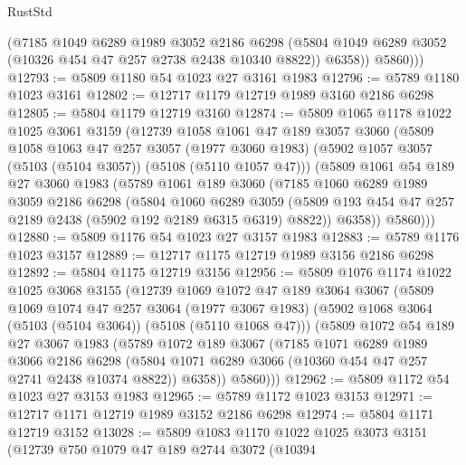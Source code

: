 \begin{lexlean}{RustStd}
\begin{coremodule}
            (@7185
              @1049
              @6289
              @1989
              @3052
              @2186
              @6298
              (@5804 @1049 @6289 @3052 (@10326 @454 @47 @257 @2738 @2438 @10340 @8822))
              @6358))
          @5860)))
@12793 := @5809 @1180 @54 @1023 @27 @3161 @1983
@12796 := @5789 @1180 @1023 @3161
@12802 := @12717 @1179 @12719 @1989 @3160 @2186 @6298
@12805 := @5804 @1179 @12719 @3160
@12874 := @5809
    @1065
    @1178
    @1022
    @1025
    @3061
    @3159
    (@12739
      @1058
      @1061
      @47
      @189
      @3057
      @3060
      (@5809
        @1058
        @1063
        @47
        @257
        @3057
        (@1977 @3060 @1983)
        (@5902 @1057 @3057 (@5103 (@5104 @3057)) (@5108 (@5110 @1057 @47)))
        (@5809
          @1061
          @54
          @189
          @27
          @3060
          @1983
          (@5789
            @1061
            @189
            @3060
            (@7185
              @1060
              @6289
              @1989
              @3059
              @2186
              @6298
              (@5804
                @1060
                @6289
                @3059
                (@5809 @193 @454 @47 @257 @2189 @2438 (@5902 @192 @2189 @6315 @6319) @8822))
              @6358))
          @5860)))
@12880 := @5809 @1176 @54 @1023 @27 @3157 @1983
@12883 := @5789 @1176 @1023 @3157
@12889 := @12717 @1175 @12719 @1989 @3156 @2186 @6298
@12892 := @5804 @1175 @12719 @3156
@12956 := @5809
    @1076
    @1174
    @1022
    @1025
    @3068
    @3155
    (@12739
      @1069
      @1072
      @47
      @189
      @3064
      @3067
      (@5809
        @1069
        @1074
        @47
        @257
        @3064
        (@1977 @3067 @1983)
        (@5902 @1068 @3064 (@5103 (@5104 @3064)) (@5108 (@5110 @1068 @47)))
        (@5809
          @1072
          @54
          @189
          @27
          @3067
          @1983
          (@5789
            @1072
            @189
            @3067
            (@7185
              @1071
              @6289
              @1989
              @3066
              @2186
              @6298
              (@5804 @1071 @6289 @3066 (@10360 @454 @47 @257 @2741 @2438 @10374 @8822))
              @6358))
          @5860)))
@12962 := @5809 @1172 @54 @1023 @27 @3153 @1983
@12965 := @5789 @1172 @1023 @3153
@12971 := @12717 @1171 @12719 @1989 @3152 @2186 @6298
@12974 := @5804 @1171 @12719 @3152
@13028 := @5809
    @1083
    @1170
    @1022
    @1025
    @3073
    @3151
    (@12739
      @750
      @1079
      @47
      @189
      @2744
      @3072
      (@10394

\end{coremodule}
\end{lexlean}
